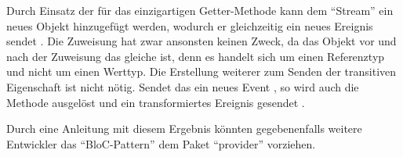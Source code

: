 Durch Einsatz der für das  einzigartigen Getter-Methode  kann dem \enquote{Stream} ein neues Objekt hinzugefügt werden,
wodurch er gleichzeitig ein neues Ereignis sendet .
Die Zuweisung hat zwar ansonsten keinen Zweck,
da das Objekt vor und nach der Zuweisung das gleiche ist,
denn es handelt sich um einen Referenztyp und nicht um einen Werttyp.
Die Erstellung weiterer  zum Senden der transitiven Eigenschaft  ist nicht nötig.
Sendet das   ein neues Event ,
so wird auch die Methode  ausgelöst und ein transformiertes Ereignis gesendet .

Durch eine Anleitung mit diesem Ergebnis könnten gegebenenfalls weitere Entwickler das \enquote{BloC-Pattern} dem Paket \enquote{provider} vorziehen.

